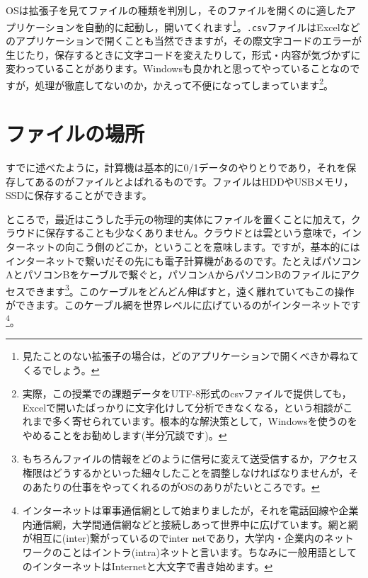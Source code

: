 \documentclass{ltjsbook}
\begin{document}
OSは拡張子を見てファイルの種類を判別し，そのファイルを開くのに適したアプリケーションを自動的に起動し，開いてくれます\footnote{見たことのない拡張子の場合は，どのアプリケーションで開くべきか尋ねてくるでしょう。}。\texttt{.csv}ファイルはExcelなどのアプリケーションで開くことも当然できますが，その際文字コードのエラーが生じたり，保存するときに文字コードを変えたりして，形式・内容が気づかずに変わっていることがあります。Windowsも良かれと思ってやっていることなのですが，処理が徹底してないのか，かえって不便になってしまっています\footnote{実際，この授業での課題データをUTF-8形式のcsvファイルで提供しても，Excelで開いたばっかりに文字化けして分析できなくなる，という相談がこれまで多く寄せられています。根本的な解決策として，Windowsを使うのをやめることをお勧めします(半分冗談です)。}。

\section{ファイルの場所}
すでに述べたように，計算機は基本的に0/1データのやりとりであり，それを保存してあるのがファイルとよばれるものです。ファイルはHDDやUSBメモリ，SSDに保存することができます。

ところで，最近はこうした手元の物理的実体にファイルを置くことに加えて，クラウドに保存することも少なくありません。クラウドとは雲という意味で，インターネットの向こう側のどこか，ということを意味します。ですが，基本的にはインターネットで繋いだその先にも電子計算機があるのです。たとえばパソコンAとパソコンBをケーブルで繋ぐと，パソコンAからパソコンBのファイルにアクセスできます\footnote{もちろんファイルの情報をどのように信号に変えて送受信するか，アクセス権限はどうするかといった細々したことを調整しなければなりませんが，そのあたりの仕事をやってくれるのがOSのありがたいところです。}。このケーブルをどんどん伸ばすと，遠く離れていてもこの操作ができます。このケーブル網を世界レベルに広げているのがインターネットです\footnote{インターネットは軍事通信網として始まりましたが，それを電話回線や企業内通信網，大学間通信網などと接続しあって世界中に広げています。網と網が相互に(inter)繋がっているのでinter netであり，大学内・企業内のネットワークのことはイントラ(intra)ネットと言います。ちなみに一般用語としてのインターネットはInternetと大文字で書き始めます。}。
\end{document}
